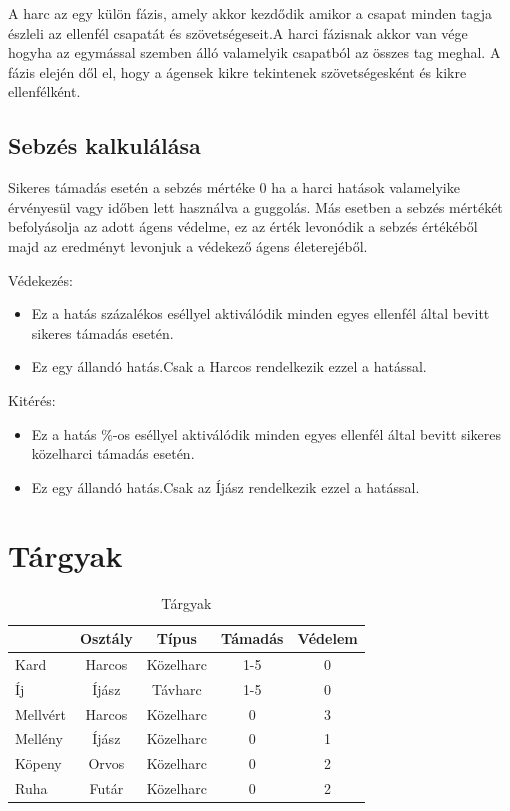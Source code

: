 A harc az egy külön fázis, amely akkor kezdődik amikor a csapat minden tagja észleli az ellenfél csapatát és szövetségeseit.A harci fázisnak akkor van vége hogyha az egymással szemben álló valamelyik csapatból az összes tag meghal. A fázis elején dől el, hogy a ágensek kikre tekintenek szövetségesként és kikre ellenfélként.

\subsection{Sebzés kalkulálása}

Sikeres támadás esetén a sebzés mértéke 0 ha a harci hatások valamelyike érvényesül vagy időben lett használva a guggolás. Más esetben a sebzés mértékét befolyásolja az adott ágens védelme, ez az érték levonódik a sebzés értékéből majd az eredményt levonjuk a védekező ágens életerejéből.

Védekezés:
\begin{itemize}
\item Ez a hatás százalékos eséllyel aktiválódik minden egyes ellenfél által bevitt sikeres támadás esetén.
\item Ez egy állandó hatás.Csak a Harcos rendelkezik ezzel a hatással.
\end{itemize}

Kitérés:
\begin{itemize}
\item Ez a hatás \%-os eséllyel aktiválódik minden egyes ellenfél által bevitt sikeres közelharci támadás esetén.
\item Ez egy állandó hatás.Csak az Íjász rendelkezik ezzel a hatással.
\end{itemize}

\newpage

\section{Tárgyak}

\begin{table}[!ht]
\centering
\caption{Tárgyak}
\label{tab:table2}
\begin{tabular}{|l|c|c|c|c|}
\hline
 & Osztály &Típus & Támadás & Védelem  \\
\hline
Kard & Harcos & Közelharc & 1-5 & 0 \\
\hline
Íj & Íjász & Távharc & 1-5 & 0  \\
\hline
Mellvért & Harcos & Közelharc & 0 & 3   \\
\hline
Mellény & Íjász & Közelharc & 0 & 1   \\
\hline
Köpeny & Orvos & Közelharc & 0 & 2    \\
\hline
Ruha & Futár & Közelharc & 0 & 2    \\
\hline
\end{tabular}
\end{table}


